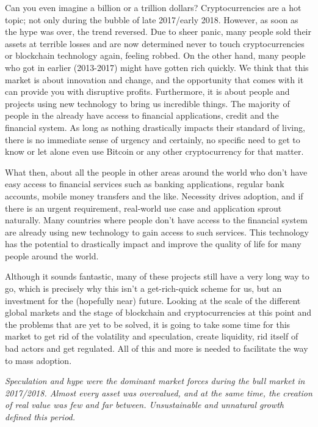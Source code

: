 \noindent Can you even imagine a billion or a trillion dollars? Cryptocurrencies are a hot topic; not only during the bubble of late 2017/early 2018. However, as soon as the hype was over, the trend reversed. Due to sheer panic, many people sold their assets at terrible losses and are now determined never to touch cryptocurrencies or blockchain technology again, feeling robbed. On the other hand, many people who got in earlier (2013-2017) might have gotten rich quickly. We think that this market is about innovation and change, and the opportunity that comes with it can provide you with disruptive profits.
Furthermore, it is about people and projects using new technology to bring us incredible things. The majority of people in the  already have access to financial applications, credit and the financial system. As long as nothing drastically impacts their standard of living, there is no immediate sense of urgency and certainly, no specific need to get to know or let alone even use Bitcoin or any other cryptocurrency for that matter.\medskip

What then, about all the people in other areas around the world who don't have easy access to financial services such as banking applications, regular bank accounts, mobile money transfers and the like. Necessity drives adoption, and if there is an urgent requirement, real-world use case and application sprout naturally. Many countries where people don't have access to the financial system are already using new technology to gain access to such services. This technology has the potential to drastically impact and improve the quality of life for many people around the world.\medskip

Although it sounds fantastic, many of these projects still have a very long way to go, which is precisely why this isn't a get-rich-quick scheme for us, but an investment for the (hopefully near) future. Looking at the scale of the different global markets and the stage of blockchain and cryptocurrencies at this point and the problems that are yet to be solved, it is going to take some time for this market to get rid of the volatility and speculation, create liquidity, rid itself of bad actors and get regulated. All of this and more is needed to facilitate the way to mass adoption.

\medskip
{}
    \begin{tcolorbox}
    [enhanced,
    title=Bull Market 2017/2018,
    frame style=
    {left color=orange!85!black,right color=yellow!95!black}]
    
               \textit{Speculation and hype were the dominant market forces during the bull market in 2017/2018. Almost every asset was overvalued, and at the same time, the creation of real value was few and far between. Unsustainable and unnatural growth defined this period.}
\end{tcolorbox}

